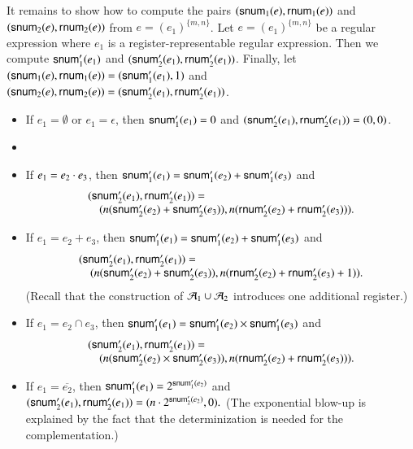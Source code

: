 It remains to show how to compute the pairs $({\sf snum}_1(e), {\sf rnum}_1(e))$ and $({\sf snum}_2(e), {\sf rnum}_2(e))$ from $e=(e_1)^{\{m,n\}}$. Let $e=(e_1)^{\{m,n\}}$ be a regular expression where $e_1$ is a register-representable regular expression. Then we compute ${\sf snum}'_1(e_1)$ and $({\sf snum}'_2(e_1), {\sf rnum}'_2(e_1))$. Finally, let $({\sf snum}_1(e), {\sf rnum}_1(e)) = ({\sf snum}'_1(e_1), 1)$ and $({\sf snum}_2(e), {\sf rnum}_2(e)) = ({\sf snum}'_2(e_1), {\sf rnum}'_2(e_1))$.
\begin{itemize}
  \item If $e_1 = \emptyset$ or $e_1 = \epsilon$, then ${\sf snum}'_1(e_1)  = 0$ and $({\sf snum}'_2(e_1), {\sf rnum}'_2(e_1))  = (0, 0)$. 
%
  \item {}
  \item If $e_1 = e_2 \cdot e_3$, then ${\sf snum}'_1(e_1) = {\sf snum}'_1(e_2) + {\sf snum}'_1(e_3)$ and 
%
  $$
  \begin{array}{l }
 ({\sf snum}'_2(e_1), {\sf rnum}'_2(e_1)) =  \\
  \ \ \ \ (n({\sf snum}'_2(e_2) + {\sf snum}'_2(e_3)), n({\sf rnum}'_2(e_2) + {\sf rnum}'_2(e_3))).
 \end{array}
  $$
%
 \item If $e_1 = e_2 + e_3$, then ${\sf snum}'_1(e_1) = {\sf snum}'_1(e_2) + {\sf snum}'_1(e_3)$ and 
%
  $$
  \begin{array}{l }
 ({\sf snum}'_2(e_1), {\sf rnum}'_2(e_1)) =  \\
  \ \ \ \ (n({\sf snum}'_2(e_2) + {\sf snum}'_2(e_3)), n({\sf rnum}'_2(e_2) + {\sf rnum}'_2(e_3)+1)).
 \end{array}
  $$
 (Recall that the construction of $\mathcal{A}_1 \cup \mathcal{A}_2$ introduces one additional register.)
%
 \item If $e_1 = e_2 \cap e_3$, then ${\sf snum}'_1(e_1) = {\sf snum}'_1(e_2) \times {\sf snum}'_1(e_3)$ and 
%
  $$
  \begin{array}{l }
 ({\sf snum}'_2(e_1), {\sf rnum}'_2(e_1)) =  \\
  \ \ \ \ (n({\sf snum}'_2(e_2) \times {\sf snum}'_2(e_3)), n({\sf rnum}'_2(e_2) + {\sf rnum}'_2(e_3))).
 \end{array}
  $$
%
 \item If $e_1 = \overline{e_2}$, then ${\sf snum}'_1(e_1) = 2^{{\sf snum}'_1(e_2)}$ and 
%
  $
 ({\sf snum}'_2(e_1), {\sf rnum}'_2(e_1)) =  (n \cdot 2^{{\sf snum}'_2(e_2)}, 0).
  $
 (The exponential blow-up is explained by the fact that the determinization is needed for the complementation.) 
%

\end{itemize}
